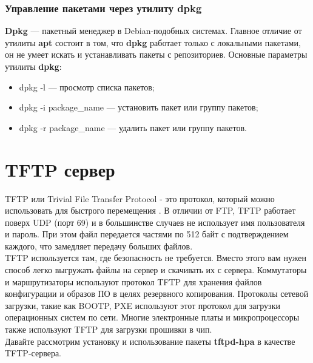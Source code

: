 \documentclass[14pt, a4paper]{article}
\begin{document}
\subsubsection*{Управление пакетами через утилиту dpkg} 

\textbf{Dpkg} — пакетный менеджер в Debian-подобных системах. Главное отличие от утилиты \textbf{apt} состоит в
том, что \textbf{dpkg} работает только с локальными пакетами, он не умеет искать и устанавливать пакеты с
репозиториев. Основные параметры утилиты \textbf{dpkg}:

\begin{itemize}
    \item \colorbox{backcolour}{dpkg -l} — просмотр списка пакетов;
    \item \colorbox{backcolour}{dpkg -i package\_name} — установить пакет или группу пакетов;
    \item \colorbox{backcolour}{dpkg -r package\_name} — удалить пакет или группу пакетов.
\end{itemize}

\newpage

\section*{TFTP сервер} 

TFTP или Trivial File Transfer Protocol - это протокол, который можно использовать для быстрого
перемещения . В отличии от FTP, TFTP работает поверх UDP (порт 69) и в
большинстве случаев не использует имя пользователя и пароль. При этом файл передается частями
по 512 байт с подтверждением каждого, что замедляет передачу больших файлов.\\

TFTP используется там, где безопасность не требуется. Вместо этого вам нужен способ легко
выгружать файлы на сервер и скачивать их с сервера. Коммутаторы и маршрутизаторы используют
протокол TFTP для хранения файлов конфигурации и образов ПО в целях резервного копирования.
Протоколы сетевой загрузки, такие как BOOTP, PXE используют этот протокол для загрузки
операционных систем по сети. Многие электронные платы и микропроцессоры также используют
TFTP для загрузки прошивки в чип.\\

Давайте рассмотрим установку и использование пакеты \textbf{tftpd-hpa} в качестве TFTP-сервера.\\
\end{document}
